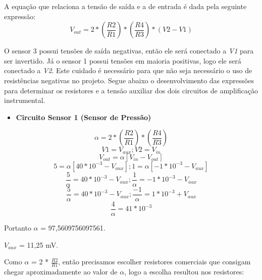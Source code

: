 A equação que relaciona a tensão de saída e a de entrada é dada pela seguinte expressão:
\begin{equation}\label{eq1tc}
    V_{out}=2*(\frac{R2}{R1})*(\frac{R4}{R3})*(V2-V1)
\end{equation}

O sensor 3 possui tensões de saída negativas, então ele será conectado a \textit{V1} para ser invertido. Já o sensor 1 possui tensões em maioria positivas, logo ele será conectado a \textit{V2}. Este cuidado é necessário para que não seja necessário o uso de resistências negativas no projeto.
Segue abaixo o desenvolvimento das expressões para determinar os resistores e a tensão auxiliar dos dois circuitos de amplificação instrumental.
\newpage
\begin{itemize}
    \item \textbf{Circuito Sensor 1 (Sensor de Pressão)}
\end{itemize}

\begin{equation}\label{eq1tc}
    \alpha = 2*(\frac{R2}{R1})*(\frac{R4}{R3})
\end{equation}
\begin{equation}\label{eq1tc}
    V1 = V_{aux}; V2 = V_{in}
\end{equation}
\begin{equation}\label{eq1tc}
    V_{out} = \alpha[V_{in} - V_{out}]
\end{equation}
\begin{equation}\label{eq1tc}
    5 = \alpha[40 * 10^{-3} - V_{aux}]; 1 = \alpha[-1 * 10^{-3} - V_{aux}]
\end{equation}
\begin{equation}\label{eq1tc}
    \frac{5}{\alpha} = 40 * 10^{-3} - V_{aux}; \frac{1}{\alpha} = -1 * 10^{-3} - V_{aux}
\end{equation}
\begin{equation}\label{eq1tc}
    \frac{5}{\alpha} = 40 * 10^{-3} - V_{aux}; \frac{-1}{\alpha} = 1 * 10^{-3} + V_{aux}
\end{equation}
\begin{equation}\label{eq1tc}
    \frac{4}{\alpha} = 41 * 10^{-3}
\end{equation}

Portanto $\alpha$ = 97,5609756097561.

\(V_{aux}\) = 11,25 mV.

Como $\alpha$ = 2 * \(\frac{R2}{R1}\), então precisamos escolher resistores comerciais que consigam chegar aproximadamente ao valor de $\alpha$, logo a escolha resultou nos resistores:

